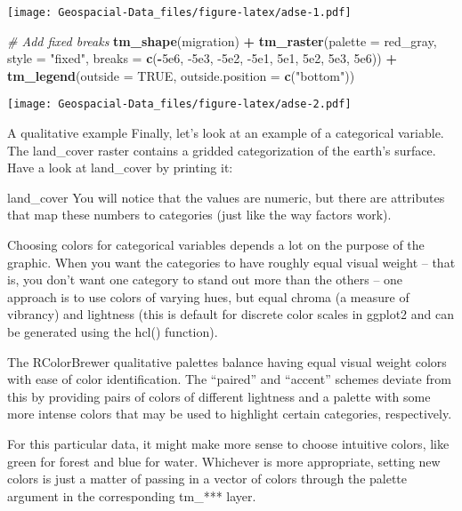 \documentclass[]{article}
\newenvironment{Shaded}{\begin{snugshade}}{\end{snugshade}}
\newcommand{\CommentTok}[1]{\textcolor[rgb]{0.56,0.35,0.01}{\textit{#1}}}
\newcommand{\DataTypeTok}[1]{\textcolor[rgb]{0.13,0.29,0.53}{#1}}
\newcommand{\FloatTok}[1]{\textcolor[rgb]{0.00,0.00,0.81}{#1}}
\newcommand{\KeywordTok}[1]{\textcolor[rgb]{0.13,0.29,0.53}{\textbf{#1}}}
\newcommand{\NormalTok}[1]{#1}
\newcommand{\OperatorTok}[1]{\textcolor[rgb]{0.81,0.36,0.00}{\textbf{#1}}}
\newcommand{\OtherTok}[1]{\textcolor[rgb]{0.56,0.35,0.01}{#1}}
\newcommand{\StringTok}[1]{\textcolor[rgb]{0.31,0.60,0.02}{#1}}
\begin{document}
\texttt{[image: Geospacial-Data\_files/figure-latex/adse-1.pdf]}

\begin{Shaded}
\begin{Highlighting}[]
\CommentTok{# Add fixed breaks }
\KeywordTok{tm_shape}\NormalTok{(migration) }\OperatorTok{+}
\StringTok{  }\KeywordTok{tm_raster}\NormalTok{(}\DataTypeTok{palette =}\NormalTok{ red_gray, }\DataTypeTok{style =} \StringTok{"fixed"}\NormalTok{, }
     \DataTypeTok{breaks =} \KeywordTok{c}\NormalTok{(}\OperatorTok{-}\FloatTok{5e6}\NormalTok{, }\FloatTok{-5e3}\NormalTok{, }\FloatTok{-5e2}\NormalTok{, }\FloatTok{-5e1}\NormalTok{, }\FloatTok{5e1}\NormalTok{, }\FloatTok{5e2}\NormalTok{, }\FloatTok{5e3}\NormalTok{, }\FloatTok{5e6}\NormalTok{)) }\OperatorTok{+}
\StringTok{  }\KeywordTok{tm_legend}\NormalTok{(}\DataTypeTok{outside =} \OtherTok{TRUE}\NormalTok{, }\DataTypeTok{outside.position =} \KeywordTok{c}\NormalTok{(}\StringTok{"bottom"}\NormalTok{))}
\end{Highlighting}
\end{Shaded}

\texttt{[image: Geospacial-Data\_files/figure-latex/adse-2.pdf]}

A qualitative example Finally, let's look at an example of a categorical
variable. The land\_cover raster contains a gridded categorization of
the earth's surface. Have a look at land\_cover by printing it:

land\_cover You will notice that the values are numeric, but there are
attributes that map these numbers to categories (just like the way
factors work).

Choosing colors for categorical variables depends a lot on the purpose
of the graphic. When you want the categories to have roughly equal
visual weight -- that is, you don't want one category to stand out more
than the others -- one approach is to use colors of varying hues, but
equal chroma (a measure of vibrancy) and lightness (this is default for
discrete color scales in ggplot2 and can be generated using the hcl()
function).

The RColorBrewer qualitative palettes balance having equal visual weight
colors with ease of color identification. The ``paired'' and ``accent''
schemes deviate from this by providing pairs of colors of different
lightness and a palette with some more intense colors that may be used
to highlight certain categories, respectively.

For this particular data, it might make more sense to choose intuitive
colors, like green for forest and blue for water. Whichever is more
appropriate, setting new colors is just a matter of passing in a vector
of colors through the palette argument in the corresponding tm\_***
layer.
\end{document}

